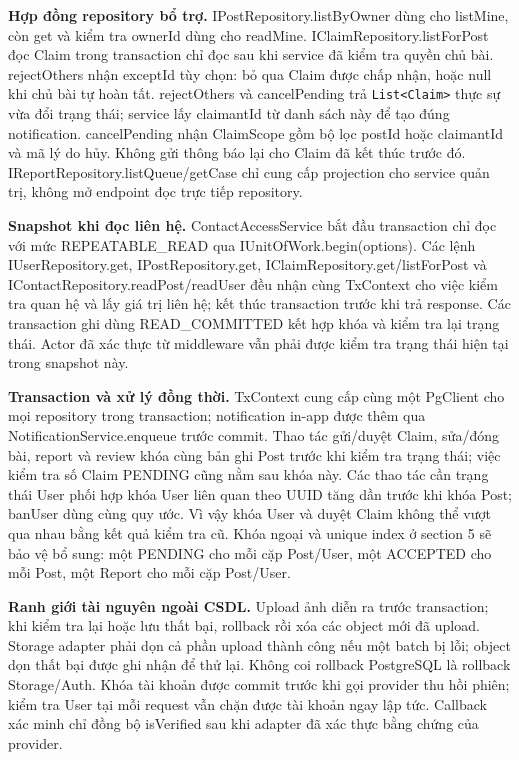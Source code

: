 \textbf{Hợp đồng repository bổ trợ.} IPostRepository.listByOwner dùng cho listMine, còn get và kiểm tra ownerId dùng cho readMine. IClaimRepository.listForPost đọc Claim trong transaction chỉ đọc sau khi service đã kiểm tra quyền chủ bài. rejectOthers nhận exceptId tùy chọn: bỏ qua Claim được chấp nhận, hoặc null khi chủ bài tự hoàn tất. rejectOthers và cancelPending trả \texttt{List<Claim>} thực sự vừa đổi trạng thái; service lấy claimantId từ danh sách này để tạo đúng notification. cancelPending nhận ClaimScope gồm bộ lọc postId hoặc claimantId và mã lý do hủy. Không gửi thông báo lại cho Claim đã kết thúc trước đó. IReportRepository.listQueue/getCase chỉ cung cấp projection cho service quản trị, không mở endpoint đọc trực tiếp repository.

\textbf{Snapshot khi đọc liên hệ.} ContactAccessService bắt đầu transaction chỉ đọc với mức REPEATABLE\_READ qua IUnitOfWork.begin(options). Các lệnh IUserRepository.get, IPostRepository.get, IClaimRepository.get/listForPost và IContactRepository.readPost/readUser đều nhận cùng TxContext cho việc kiểm tra quan hệ và lấy giá trị liên hệ; kết thúc transaction trước khi trả response. Các transaction ghi dùng READ\_COMMITTED kết hợp khóa và kiểm tra lại trạng thái. Actor đã xác thực từ middleware vẫn phải được kiểm tra trạng thái hiện tại trong snapshot này.

\textbf{Transaction và xử lý đồng thời.} TxContext cung cấp cùng một PgClient cho mọi repository trong transaction; notification in-app được thêm qua NotificationService.enqueue trước commit. Thao tác gửi/duyệt Claim, sửa/đóng bài, report và review khóa cùng bản ghi Post trước khi kiểm tra trạng thái; việc kiểm tra số Claim PENDING cũng nằm sau khóa này. Các thao tác cần trạng thái User phối hợp khóa User liên quan theo UUID tăng dần trước khi khóa Post; banUser dùng cùng quy ước. Vì vậy khóa User và duyệt Claim không thể vượt qua nhau bằng kết quả kiểm tra cũ. Khóa ngoại và unique index ở section 5 sẽ bảo vệ bổ sung: một PENDING cho mỗi cặp Post/User, một ACCEPTED cho mỗi Post, một Report cho mỗi cặp Post/User.

\textbf{Ranh giới tài nguyên ngoài CSDL.} Upload ảnh diễn ra trước transaction; khi kiểm tra lại hoặc lưu thất bại, rollback rồi xóa các object mới đã upload. Storage adapter phải dọn cả phần upload thành công nếu một batch bị lỗi; object dọn thất bại được ghi nhận để thử lại. Không coi rollback PostgreSQL là rollback Storage/Auth. Khóa tài khoản được commit trước khi gọi provider thu hồi phiên; kiểm tra User tại mỗi request vẫn chặn được tài khoản ngay lập tức. Callback xác minh chỉ đồng bộ isVerified sau khi adapter đã xác thực bằng chứng của provider.
